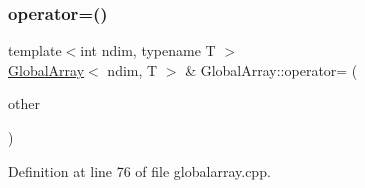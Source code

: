 \subsubsection{\texorpdfstring{operator=()}{operator=()}\hspace{0.1cm}{\footnotesize\ttfamily [1/3]}}
{\footnotesize\ttfamily template$<$int ndim, typename T $>$ \\
\hyperlink{classshark_1_1ndim_1_1_global_array}{Global\+Array}$<$ ndim, T $>$ \& Global\+Array\+::operator= (\begin{DoxyParamCaption}\item[{\hyperlink{classshark_1_1ndim_1_1_global_array}{Global\+Array}$<$ ndim, T $>$ \&\&}]{other }\end{DoxyParamCaption})}



Definition at line 76 of file globalarray.\+cpp.



